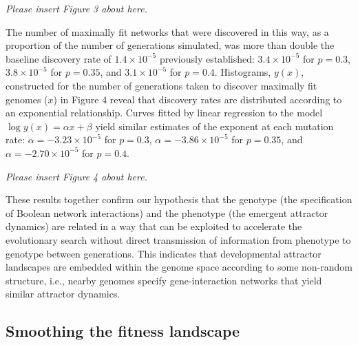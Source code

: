 \documentclass[10pt,letterpaper]{article}
\begin{document}
\vspace{1em}\emph{\noindent Please insert Figure 3 about here.}\vspace{1em}

The number of maximally fit networks that were discovered in this way, as a proportion of the number of generations simulated, was more than double the baseline discovery rate of $1.4\times 10^{-5}$ previously established: $3.4\times 10^{-5}$ for $p=0.3$, $3.8\times 10^{-5}$ for $p=0.35$, and $3.1\times 10^{-5}$ for $p=0.4$. %
Histograms, $y(x)$, constructed for the number of generations taken to discover maximally fit genomes ($x$) in Figure 4 reveal that discovery rates are distributed according to an exponential relationship. Curves fitted by linear regression to the model $\log y(x)=\alpha x+\beta$ yield similar estimates of the exponent at each mutation rate: $\alpha=-3.23\times 10^{-5}$ for $p=0.3$,  $\alpha=-3.86\times 10^{-5}$ for $p=0.35$, and $\alpha=-2.70\times 10^{-5}$ for $p=0.4$. %

\vspace{1em}\emph{\noindent Please insert Figure 4 about here.}\vspace{1em}

These results together confirm our hypothesis that the genotype (the specification of Boolean network interactions) and the phenotype (the emergent attractor dynamics) are related in a way that can be exploited to accelerate the evolutionary search  without direct transmission of information from phenotype to genotype between generations. This indicates that developmental attractor landscapes are embedded within the genome space according to some non-random structure, i.e., nearby genomes specify gene-interaction networks that yield similar attractor dynamics.

\subsection*{Smoothing the fitness landscape}
\end{document}
